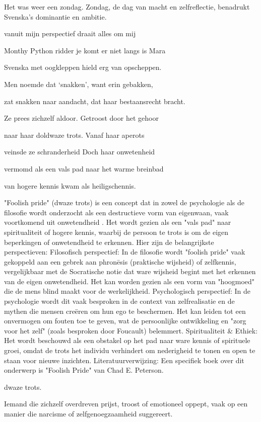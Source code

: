Het was weer een zondag.
Zondag, de dag van macht en zelfreflectie, benadrukt Svenska’s dominantie en ambitie.

vanuit mijn perspectief draait alles om mij

Monthy Python ridder je komt er niet langs is Mara

Svenska met oogkleppen
hield erg van opscheppen.

Men noemde dat ‘snakken’,
want erin gebakken,

zat snakken naar aandacht,
dat haar bestaansrecht bracht.

Ze prees zichzelf aldoor.
Getroost door het gehoor

naar haar doldwaze trots.
Vanaf haar aperots

veinsde ze schranderheid
Doch haar onwetenheid

vermomd als een vals pad
naar het warme breinbad

van hogere kennis
kwam als heiligschennis.

"Foolish pride" (dwaze trots) is een concept dat in zowel de psychologie als de filosofie wordt onderzocht als een destructieve vorm van eigenwaan, vaak voortkomend uit onwetendheid . Het wordt gezien als een "vals pad" naar spiritualiteit of hogere kennis, waarbij de persoon te trots is om de eigen beperkingen of onwetendheid te erkennen.
Hier zijn de belangrijkste perspectieven:
Filosofisch perspectief: In de filosofie wordt "foolish pride" vaak gekoppeld aan een gebrek aan phronēsis (praktische wijsheid) of zelfkennis, vergelijkbaar met de Socratische notie dat ware wijsheid begint met het erkennen van de eigen onwetendheid. Het kan worden gezien als een vorm van "hoogmoed" die de mens blind maakt voor de werkelijkheid.
Psychologisch perspectief: In de psychologie wordt dit vaak besproken in de context van zelfrealisatie en de mythen die mensen creëren om hun ego te beschermen. Het kan leiden tot een onvermogen om fouten toe te geven, wat de persoonlijke ontwikkeling en "zorg voor het zelf" (zoals besproken door Foucault) belemmert.
Spiritualiteit \& Ethiek: Het wordt beschouwd als een obstakel op het pad naar ware kennis of spirituele groei, omdat de trots het individu verhindert om nederigheid te tonen en open te staan voor nieuwe inzichten.
Literatuurverwijzing: Een specifiek boek over dit onderwerp is "Foolish Pride" van Chad E. Peterson.

dwaze trots.

Iemand die zichzelf overdreven prijst, troost of emotioneel oppept, vaak op een manier die narcisme of zelfgenoegzaamheid suggereert.

